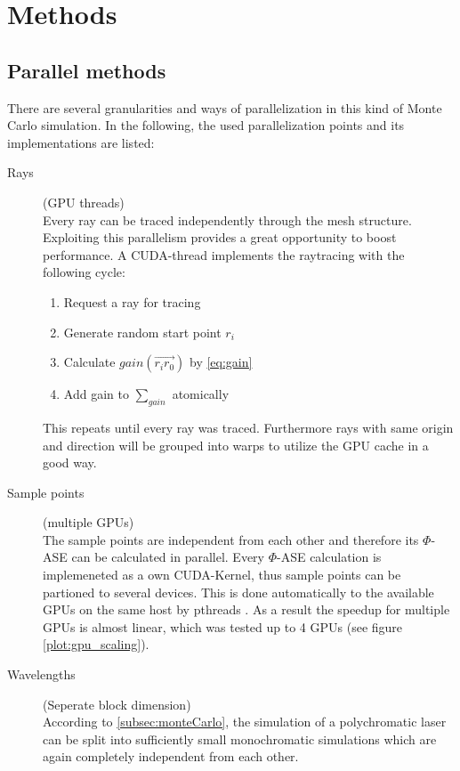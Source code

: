 \section{Methods}


\subsection{Parallel methods}
There are several granularities and ways of parallelization in this kind of 
Monte Carlo simulation. In the following, the used parallelization points and
its implementations are listed:

\begin{description}

\item[Rays] (GPU threads)\\
    Every ray can be traced independently through the mesh structure.
    Exploiting this parallelism provides a great opportunity to boost
    performance. A CUDA-thread implements the raytracing with the 
    following cycle:
    \begin{enumerate}
      \item Request a ray for tracing
      \item Generate random start point $r_i$
      \item Calculate $gain(\overrightarrow{r_ir_0})$ by \eqref{eq:gain}
      \item Add gain to $\sum_{gain}$ atomically
    \end{enumerate}
    This repeats until every ray was traced. Furthermore rays with same
    origin and direction will be grouped into warps to utilize the
    GPU cache in a good way.

  \item[Sample points] (multiple GPUs)\\
    The sample points are independent from each other
    and therefore its $\Phi$-ASE can be calculated in parallel. Every $\Phi$-ASE
    calculation is implemeneted as a own CUDA-Kernel, thus sample points can be partioned 
    to several devices. This is done automatically to the available GPUs on
    the same host by pthreads \cite{pthreads}. As a result the speedup for multiple
    GPUs is almost linear, which was tested up to 4 GPUs (see figure \ref{plot:gpu_scaling}).

  \item[Wavelengths] (Seperate block dimension)\\
    According to \ref{subsec:monteCarlo}, the simulation of a polychromatic
    laser can be split into sufficiently small monochromatic simulations which
    are again completely independent from each other.

\end{description}

